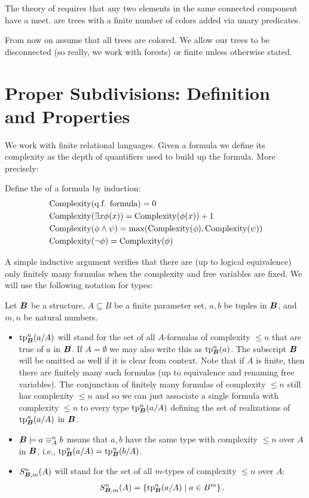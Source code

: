 The theory of  requires that any two elements in the same connected component have a meet.  are trees with a finite number of colors added via unary predicates.

From now on assume that all trees are colored.
We allow our trees to be disconnected (so really, we work with forests) or finite unless otherwise stated.

\section{Proper Subdivisions: Definition and Properties}
We work with finite relational languages.
Given a formula we define its complexity as the depth of quantifiers used to build up the formula. More precisely:
\begin{Definition}
  Define the  of a formula by induction:
  \begin{align*}
    &\operatorname{Complexity}(\text{q.f. formula}) = 0 \\
    &\operatorname{Complexity}(\exists x \phi(x)) = \operatorname{Complexity}(\phi(x)) + 1 \\
    &\operatorname{Complexity}(\phi \wedge \psi) = \max(\operatorname{Complexity}(\phi), \operatorname{Complexity}(\psi)) \\
    &\operatorname{Complexity}(\neg \phi) = \operatorname{Complexity}(\phi)
  \end{align*}
\end{Definition}
A simple inductive argument verifies that there are (up to logical equivalence) only finitely many formulas when the complexity
and free variables are fixed.
We will use the following notation for types:
\begin{Definition} Let $\operatorname{\boldsymbol B}$ be a structure, $A \subseteq B$ be a finite parameter set, $a,b$ be tuples in $\operatorname{\boldsymbol B}$, and $m, n$ be natural numbers.
  \begin{itemize}
  \item $\operatorname{tp}^n_{\operatorname{\boldsymbol B}}(a/A)$ will stand for the set of all $A$-formulas of complexity $\leq n$ that are true of $a$ in $\operatorname{\boldsymbol B}$.
    If $A = \emptyset$ we may also write this as $\operatorname{tp}^n_{\operatorname{\boldsymbol B}}(a)$.
    The subscript $\operatorname{\boldsymbol B}$ will be omitted as well if it is clear from context.
    Note that if $A$ is finite, then there are finitely many such formulas (up to equivalence and renaming free variables).
    The conjunction of finitely many formulas of complexity $\leq n$
    still has complexity $\leq n$ and so we can just associate a single formula with complexity $\leq n$ to every type $\operatorname{tp}^n_{\operatorname{\boldsymbol B}}(a/A)$
    defining the set of realizations of $\operatorname{tp}^n_{\operatorname{\boldsymbol B}}(a/A)$ in $\operatorname{\boldsymbol B}$.
  \item $\operatorname{\boldsymbol B} \models a \equiv^n_A b$ means that $a,b$ have the same type with complexity $\leq n$ over $A$ in $\operatorname{\boldsymbol B}$, i.e., $\operatorname{tp}^n_{\operatorname{\boldsymbol B}}(a/A) = \operatorname{tp}^n_{\operatorname{\boldsymbol B}}(b/A)$.
  \item $S^n_{\operatorname{\boldsymbol B}, m}(A)$ will stand for the set of all $m$-types of complexity $\leq n$ over $A$:
    \begin{align*}
      S^n_{\operatorname{\boldsymbol B}, m}(A) = \left\{\operatorname{tp}^n_{\operatorname{\boldsymbol B}}(a/A) \mid a \in B^m\right\}.
    \end{align*}
  \end{itemize}
\end{Definition}

